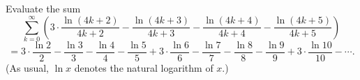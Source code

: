 Evaluate the sum
\[\sum_{k=0}^{\infty}\left(3\cdot\frac{\ln(4k+2)}{4k+2}-\frac{\ln(4k+3)}{4k+3}-\frac{\ln(4k+4)}{4k+4}-\frac{\ln(4k+5)}{4k+5}\right)\]\[=3\cdot\frac{\ln 2}2-\frac{\ln 3}3-\frac{\ln 4}4-\frac{\ln 5}5+3\cdot\frac{\ln 6}6-\frac{\ln 7}7-\frac{\ln 8}8-\frac{\ln 9}9+3\cdot\frac{\ln 10}{10}-\cdots.\](As usual, $\ln x$ denotes the natural logarithm of $x.$)